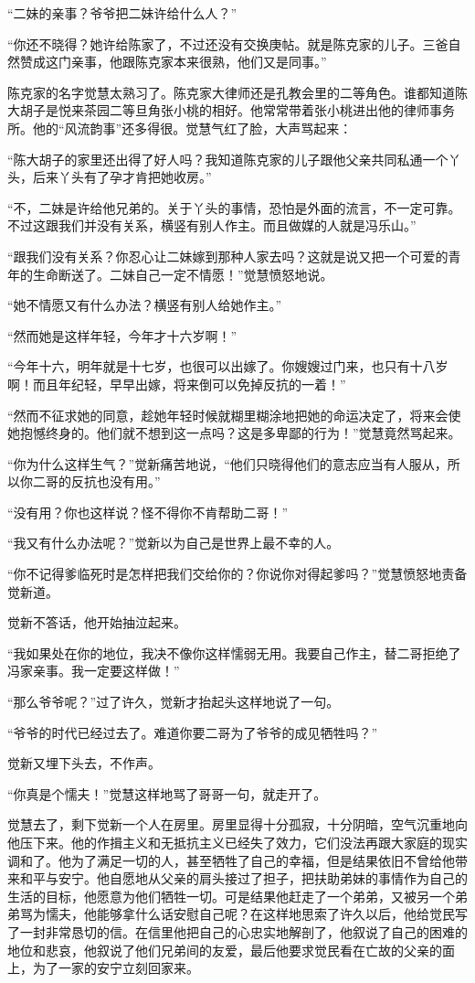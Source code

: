 \par “二妹的亲事？爷爷把二妹许给什么人？”
\par “你还不晓得？她许给陈家了，不过还没有交换庚帖。就是陈克家的儿子。三爸自然赞成这门亲事，他跟陈克家本来很熟，他们又是同事。”
\par 陈克家的名字觉慧太熟习了。陈克家大律师还是孔教会里的二等角色。谁都知道陈大胡子是悦来茶园二等旦角张小桃的相好。他常常带着张小桃进出他的律师事务所。他的“风流韵事”还多得很。觉慧气红了脸，大声骂起来：
\par “陈大胡子的家里还出得了好人吗？我知道陈克家的儿子跟他父亲共同私通一个丫头，后来丫头有了孕才肯把她收房。”
\par “不，二妹是许给他兄弟的。关于丫头的事情，恐怕是外面的流言，不一定可靠。不过这跟我们并没有关系，横竖有别人作主。而且做媒的人就是冯乐山。”
\par “跟我们没有关系？你忍心让二妹嫁到那种人家去吗？这就是说又把一个可爱的青年的生命断送了。二妹自己一定不情愿！”觉慧愤怒地说。
\par “她不情愿又有什么办法？横竖有别人给她作主。”
\par “然而她是这样年轻，今年才十六岁啊！”
\par “今年十六，明年就是十七岁，也很可以出嫁了。你嫂嫂过门来，也只有十八岁啊！而且年纪轻，早早出嫁，将来倒可以免掉反抗的一着！”
\par “然而不征求她的同意，趁她年轻时候就糊里糊涂地把她的命运决定了，将来会使她抱憾终身的。他们就不想到这一点吗？这是多卑鄙的行为！”觉慧竟然骂起来。
\par “你为什么这样生气？”觉新痛苦地说，“他们只晓得他们的意志应当有人服从，所以你二哥的反抗也没有用。”
\par “没有用？你也这样说？怪不得你不肯帮助二哥！”
\par “我又有什么办法呢？”觉新以为自己是世界上最不幸的人。
\par “你不记得爹临死时是怎样把我们交给你的？你说你对得起爹吗？”觉慧愤怒地责备觉新道。
\par 觉新不答话，他开始抽泣起来。
\par “我如果处在你的地位，我决不像你这样懦弱无用。我要自己作主，替二哥拒绝了冯家亲事。我一定要这样做！”
\par “那么爷爷呢？”过了许久，觉新才抬起头这样地说了一句。
\par “爷爷的时代已经过去了。难道你要二哥为了爷爷的成见牺牲吗？”
\par 觉新又埋下头去，不作声。
\par “你真是个懦夫！”觉慧这样地骂了哥哥一句，就走开了。
\par 觉慧去了，剩下觉新一个人在房里。房里显得十分孤寂，十分阴暗，空气沉重地向他压下来。他的作揖主义和无抵抗主义已经失了效力，它们没法再跟大家庭的现实调和了。他为了满足一切的人，甚至牺牲了自己的幸福，但是结果依旧不曾给他带来和平与安宁。他自愿地从父亲的肩头接过了担子，把扶助弟妹的事情作为自己的生活的目标，他愿意为他们牺牲一切。可是结果他赶走了一个弟弟，又被另一个弟弟骂为懦夫，他能够拿什么话安慰自己呢？在这样地思索了许久以后，他给觉民写了一封非常恳切的信。在信里他把自己的心忠实地解剖了，他叙说了自己的困难的地位和悲哀，他叙说了他们兄弟间的友爱，最后他要求觉民看在亡故的父亲的面上，为了一家的安宁立刻回家来。
